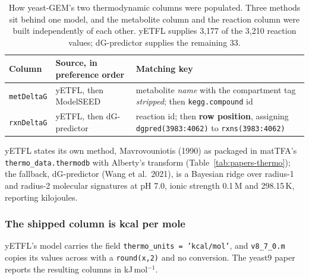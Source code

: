 \begin{table}[!htbp]
  \centering
  \footnotesize
  \caption[Provenance of the shipped formation energies]{How yeast-GEM's two thermodynamic
  columns were populated. Three methods sit behind one model, and the metabolite column and
  the reaction column were built independently of each other. yETFL supplies 3{,}177 of the
  3{,}210 reaction values; dG-predictor supplies the remaining 33.}
  \label{tab:shipped-provenance}
  \begin{tabular}{@{}lp{}p{}@{}}
    \hline
    Column & Source, in preference order & Matching key \\
    \hline
    \texttt{metDeltaG} & yETFL, then ModelSEED &
      metabolite \emph{name} with the compartment tag \emph{stripped}; then
      \texttt{kegg.compound} id \\
    \texttt{rxnDeltaG} & yETFL, then dG-predictor &
      reaction id; then \textbf{row position}, assigning
      \texttt{dgpred(3983:4062)} to \texttt{rxns(3983:4062)} \\
    \hline
  \end{tabular}
\end{table}

yETFL states its own method, Mavrovouniotis (1990) as packaged in matTFA's
\texttt{thermo\_data.thermodb} with Alberty's transform (Table~\ref{tab:papers-thermo}); the
fallback, dG-predictor (Wang et al.\ 2021), is a Bayesian ridge over radius-1 and radius-2
molecular signatures at pH 7.0, ionic strength 0.1\,M and 298.15\,K, reporting kilojoules. 

\subsubsection*{The shipped column is kcal per mole}

yETFL's model carries the field \texttt{thermo\_units = 'kcal/mol'}, and
\texttt{v8\_7\_0.m} copies its values across with a \texttt{round(x,2)} and no conversion.
The yeast9 paper reports the resulting columns in kJ\,mol$^{-1}$.


